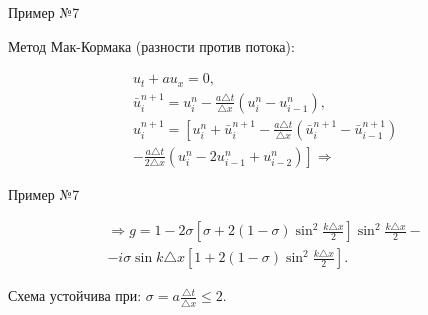 \documentclass[10pt,xcolor=pst,aspectratio=169]{beamer}
\begin{document}
\begin{frame}{Пример №7}

	\transdissolve[duration=0.1]
	\justifying
	\large

	Метод Мак-Кормака (разности против потока):

	\[
		\begin{split}
			&u_{t} + a u_{x} = 0 , \\
			&\bar{u}^{n + 1}_{i} = u^{n}_{i} - \frac{a \triangle t}{\triangle x} (u^{n}_{i} - u^{n}_{i - 1}) , \\
			&u^{n + 1}_{i} = \left[ u^{n}_{i} + \bar{u}^{n + 1}_{i} - \frac{a \triangle t}{\triangle x} (\bar{u}^{n + 1}_{i} - \bar{u}^{n + 1}_{i - 1}) \right. \\
			& \left. - \frac{a \triangle t}{2 \triangle x} (u^{n}_{i} - 2 u^{n}_{i - 1} + u^{n}_{i - 2}) \right] \Rightarrow
		\end{split}
	\]

\end{frame}

\begin{frame}{Пример №7}

	\transdissolve[duration=0.1]
	\justifying
	\large

	\[
		\begin{split}
			& \Rightarrow g = 1 - 2 \sigma \left[ \sigma + 2 (1 - \sigma) \sin^{2} \frac{k \triangle x}{2} \right] \sin^{2} \frac{k \triangle x}{2} - \\
			& - i \sigma \sin k \triangle x \left[ 1 + 2 (1 - \sigma) \sin^{2} \frac{k \triangle x}{2} \right] .
		\end{split}
	\]

    Схема устойчива при: $\sigma = a \frac{\triangle t}{\triangle x} \leq 2$.\\

\end{frame}
\end{document}
